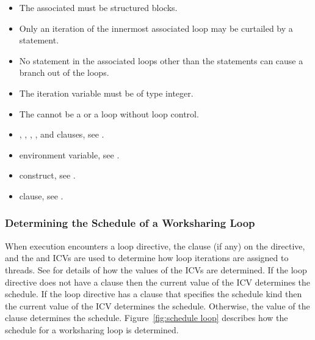 \fortranspecificstart
\begin{itemize}
\item The associated  must be structured blocks.

\item Only an iteration of the innermost associated loop may be curtailed by a  
statement.

\item No statement in the associated loops other than the  statements can cause a branch 
out of the loops.

\item The  iteration variable must be of type integer.

\item The  cannot be a  or a  loop without loop control.
\end{itemize}
\fortranspecificend

\crossreferences
\begin{itemize}
\item {}, , , , and  clauses, see 
.

\item {} environment variable, see 
.

\item {} construct, see 
.

\item {} clause, see
.
\end{itemize}








\subsubsection{Determining the Schedule of a Worksharing Loop}
\label{subsubsec:Determining the Schedule of a Worksharing Loop}
When execution encounters a loop directive, the  clause (if any) on the 
directive, and the  and  ICVs are used to determine how loop 
iterations are assigned to threads. See 
for details of how the 
values of the ICVs are determined. If the loop directive does not have a  
clause then the current value of the \mbox{} ICV determines the schedule. If the 
loop directive has a  clause that specifies the  schedule kind then 
the current value of the  ICV determines the schedule. Otherwise, the 
value of the  clause determines the schedule. Figure~\ref{fig:schedule loop}
describes how the schedule for a worksharing loop is determined.
\crossreferences

